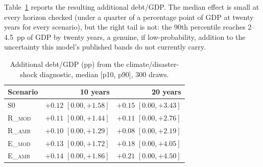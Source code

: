 \documentclass[11pt,a4paper]{article}
\begin{document}
Table~\ref{tab:dis1} reports the resulting additional debt/GDP. The median effect is small at every horizon checked (under a quarter of a percentage point of GDP at twenty years for every scenario), but the right tail is not: the 90th percentile reaches 2--4.5~pp of GDP by twenty years, a genuine, if low-probability, addition to the uncertainty this model's published bands do not currently carry.

\begin{table}[htbp]
\centering\small
\caption{Additional debt/GDP (pp) from the climate/disaster-shock diagnostic, median [p10, p90], 300 draws.}
\label{tab:dis1}
\begin{tabular}{lrr}
\toprule
Scenario & 10 years & 20 years \\
\midrule
\textsc{S0} & $+0.12$ $[0.00,+1.58]$ & $+0.15$ $[0.00,+3.43]$ \\
\textsc{R\_mod} & $+0.11$ $[0.00,+1.44]$ & $+0.11$ $[0.00,+2.76]$ \\
\textsc{R\_amb} & $+0.10$ $[0.00,+1.29]$ & $+0.08$ $[0.00,+2.19]$ \\
\textsc{E\_mod} & $+0.13$ $[0.00,+1.72]$ & $+0.18$ $[0.00,+4.05]$ \\
\textsc{E\_amb} & $+0.14$ $[0.00,+1.86]$ & $+0.21$ $[0.00,+4.50]$ \\
\bottomrule
\end{tabular}
\end{table}
\end{document}
